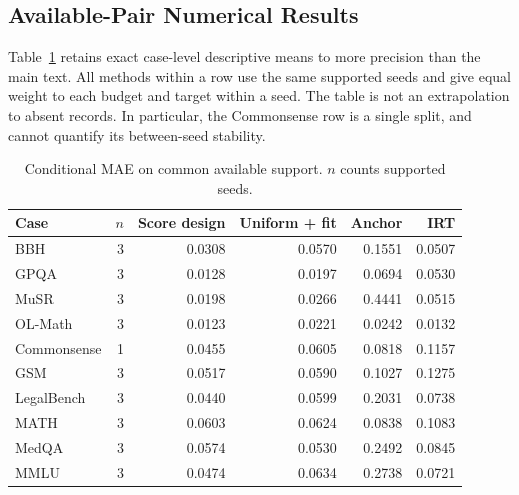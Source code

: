 \documentclass{article}
\begin{document}
\subsection{Available-Pair Numerical Results}
Table~\ref{tab:cases_si} retains exact case-level descriptive means to more precision than the main text. All methods within a row use the same supported seeds and give equal weight to each budget and target within a seed. The table is not an extrapolation to absent records. In particular, the Commonsense row is a single split, and cannot quantify its between-seed stability.
\begin{table}[h]
\centering
\caption{Conditional MAE on common available support. $n$ counts supported seeds.}
\label{tab:cases_si}
\begin{tabular}{lrrrrr}
\toprule
Case & $n$ & Score design & Uniform + fit & Anchor & IRT\\
\midrule
BBH & 3 & 0.0308 & 0.0570 & 0.1551 & 0.0507 \\
GPQA & 3 & 0.0128 & 0.0197 & 0.0694 & 0.0530 \\
MuSR & 3 & 0.0198 & 0.0266 & 0.4441 & 0.0515 \\
OL-Math & 3 & 0.0123 & 0.0221 & 0.0242 & 0.0132 \\
Commonsense & 1 & 0.0455 & 0.0605 & 0.0818 & 0.1157 \\
GSM & 3 & 0.0517 & 0.0590 & 0.1027 & 0.1275 \\
LegalBench & 3 & 0.0440 & 0.0599 & 0.2031 & 0.0738 \\
MATH & 3 & 0.0603 & 0.0624 & 0.0838 & 0.1083 \\
MedQA & 3 & 0.0574 & 0.0530 & 0.2492 & 0.0845 \\
MMLU & 3 & 0.0474 & 0.0634 & 0.2738 & 0.0721 \\
\bottomrule
\end{tabular}
\end{table}
\end{document}
